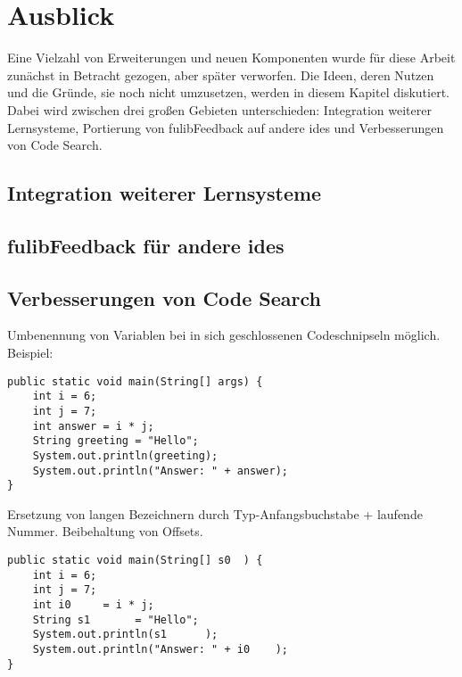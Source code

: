 \chapter{Ausblick}\label{ch:future-work}

Eine Vielzahl von Erweiterungen und neuen Komponenten wurde für diese Arbeit zunächst in Betracht gezogen, aber später verworfen.
Die Ideen, deren Nutzen und die Gründe, sie noch nicht umzusetzen, werden in diesem Kapitel diskutiert.
Dabei wird zwischen drei großen Gebieten unterschieden:
Integration weiterer Lernsysteme, Portierung von fulibFeedback auf andere \acp{ide} und Verbesserungen von Code Search.

\section{Integration weiterer Lernsysteme}


\section{fulibFeedback für andere \acsp{ide}}\label{sec:other-ides}


\section{Verbesserungen von Code Search}\label{sec:code-search-improvements}


Umbenennung von Variablen bei in sich geschlossenen Codeschnipseln möglich.
Beispiel:

\begin{verbatim}
public static void main(String[] args) {
    int i = 6;
    int j = 7;
    int answer = i * j;
    String greeting = "Hello";
    System.out.println(greeting);
    System.out.println("Answer: " + answer);
}
\end{verbatim}

Ersetzung von langen Bezeichnern durch Typ-Anfangsbuchstabe + laufende Nummer.
Beibehaltung von Offsets.

\begin{verbatim}
public static void main(String[] s0  ) {
    int i = 6;
    int j = 7;
    int i0     = i * j;
    String s1       = "Hello";
    System.out.println(s1      );
    System.out.println("Answer: " + i0    );
}
\end{verbatim}

